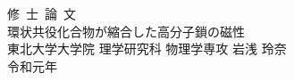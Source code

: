 \begin{titlepage}
\begin{spacing}{2.3}

\begin{center}
\vspace*{50truept}
{\huge 修\ 士\ 論\ 文}\\
\vspace{50truept}
{\huge 環状共役化合物が縮合した高分子鎖の磁性}\\ %
\vspace{250truept}
{\LARGE 東北大学大学院 理学研究科 物理学専攻}
{\LARGE 岩浅 玲奈}\\
{\LARGE 令和元年}\\
\end{center}

\end{spacing}
\end{titlepage}